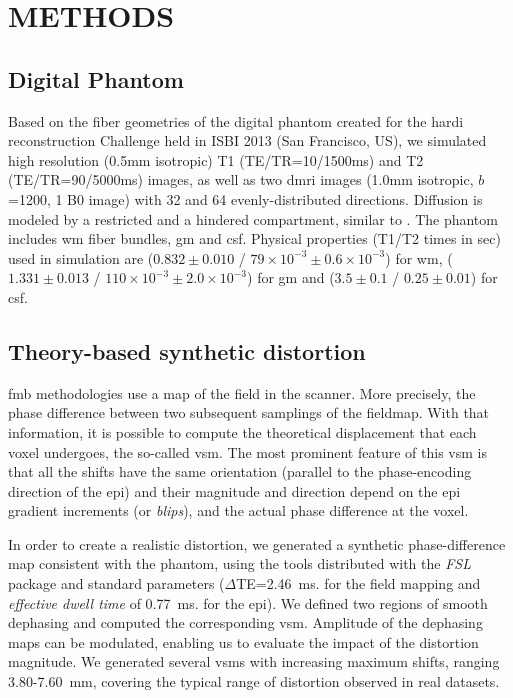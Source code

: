 \section{METHODS}

\subsection{Digital Phantom}
Based on the fiber geometries of the digital phantom 
created for the \gls*{hardi} 
reconstruction Challenge held in ISBI 2013 
(San Francisco, US), we simulated high resolution 
(0.5mm isotropic) T1 (TE/TR=10/1500ms) and T2 
(TE/TR=90/5000ms) images, as well as two \gls*{dmri}
images (1.0mm isotropic, $b$=1200, 1 B0 image) with
32 and 64 evenly-distributed directions.
Diffusion is modeled by a restricted and a hindered
compartment, similar to \cite{assaf_composite_2005}.
The phantom includes \gls*{wm} fiber bundles,
\gls*{gm} and \gls*{csf}. Physical properties
(T1/T2 times in sec) used in simulation are
($0.832\pm0.010$ / $79\times10^{-3}\pm0.6\times10^{-3}$)
for \gls*{wm},
($1.331\pm0.013$ / $110\times10^{-3}\pm2.0\times10^{-3}$) for
\gls*{gm} and ($3.5\pm0.1$ / $0.25\pm0.01$) for \gls*{csf}.

\subsection{Theory-based synthetic distortion}
\label{sec:distortion}
\Gls*{fmb} methodologies use a map
of the field in the scanner. More precisely, the
phase difference between two subsequent samplings
of the fieldmap. With that information, it is possible
to compute the theoretical displacement that each
voxel undergoes, the so-called \gls*{vsm}. The
most prominent feature of this \gls*{vsm} is that all
the shifts have the same orientation (parallel to the
phase-encoding direction of the \gls*{epi}) and their
magnitude and direction depend on the \gls*{epi} 
gradient increments (or \emph{blips}), and the actual
phase difference at the voxel.

In order to create a realistic distortion, we
generated a synthetic phase-difference map 
consistent with the phantom, using the 
tools distributed with the \emph{FSL} package 
\cite{jenkinson_fsl_2012}  and
standard parameters ($\Delta$TE=2.46~ms. for the
field mapping and \emph{effective dwell time} of 
0.77~ms. for the \gls*{epi}).
We defined two regions of smooth dephasing and 
computed the corresponding \gls*{vsm}. Amplitude
of the dephasing maps can be modulated, enabling
us to evaluate the impact of the distortion magnitude.
We generated several \glspl*{vsm} with increasing
maximum shifts, ranging 3.80-7.60~mm, covering the
typical range of distortion observed in real datasets.

